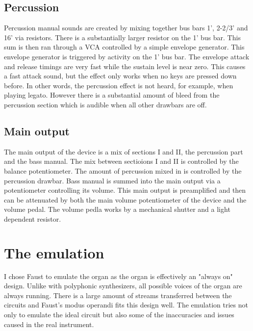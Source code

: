 \documentclass[11pt,a4paper]{article}
\begin{document}
\subsection{Percussion}

Percussion manual sounds are created by mixing together bus bars 1', 2-2/3' and 16' via resistors. There is a substantially larger resistor on the 1' bus bar. This sum is then ran through a VCA controlled by a simple envelope generator. This envelope generator is triggered by activity on the 1' bus bar. The envelope attack and release timings are very fast while the sustain level is near zero. This causes a fast attack sound, but the effect only works when no keys are pressed down before. In other words, the percussion effect is not heard, for example, when playing legato. However there is a substantial amount of bleed from the percussion section which is audible when all other drawbars are off.


\subsection{Main output}

The main output of the device is a mix of sections I and II, the percussion part and the bass manual. The mix between sectioions I and II is controlled by the balance potentiometer. The amount of percussion mixed in is controlled by the percussion drawbar. Bass manual is summed into the main output via a potentiometer controlling its volume. This main output is preamplified and then can be attenuated by both the main volume potentiometer of the device and the volume pedal. The volume pedla works by a mechanical shutter and a light dependent resistor.

\section{The emulation} 

I chose Faust to emulate the organ as the organ is effectively an "always on" design. Unlike with polyphonic synthesizers, all possible voices of the organ are always running. There is a large amount of streams transferred between the circuits and Faust's modus operandi fits this design well. The emulation tries not only to emulate the ideal circuit but also some of the inaccuracies and issues caused in the real instrument. 
\end{document}
